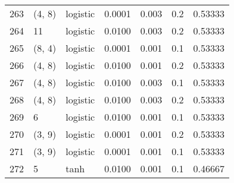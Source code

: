 \begin{tabular}{lllrrrr}
263 &      (4, 8) &  logistic &  0.0001 &  0.003 &  0.2 &   0.53333 \\
264 &          11 &  logistic &  0.0100 &  0.003 &  0.2 &   0.53333 \\
265 &      (8, 4) &  logistic &  0.0001 &  0.001 &  0.1 &   0.53333 \\
266 &      (4, 8) &  logistic &  0.0100 &  0.001 &  0.2 &   0.53333 \\
267 &      (4, 8) &  logistic &  0.0100 &  0.003 &  0.1 &   0.53333 \\
268 &      (4, 8) &  logistic &  0.0100 &  0.003 &  0.2 &   0.53333 \\
269 &           6 &  logistic &  0.0100 &  0.001 &  0.1 &   0.53333 \\
270 &      (3, 9) &  logistic &  0.0001 &  0.001 &  0.2 &   0.53333 \\
271 &      (3, 9) &  logistic &  0.0001 &  0.001 &  0.1 &   0.53333 \\
272 &           5 &      tanh &  0.0100 &  0.001 &  0.1 &   0.46667 \\
\bottomrule
\end{tabular}
